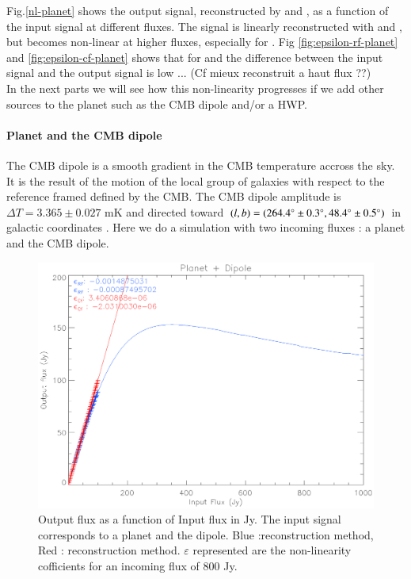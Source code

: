 Fig.\ref{nl-planet} shows the output signal, reconstructed by \rf and \cf, as a function of the input signal at different fluxes. The signal is linearly reconstructed with \rf and \cf, but becomes non-linear at higher fluxes, especially for \rf. Fig \ref{fig:epsilon-rf-planet} and \ref{fig:epsilon-cf-planet} shows that for \rf and \cf the difference between the input signal and the output signal is low ... (Cf mieux reconstruit a haut flux ??)\\

In the next parts we will see how this non-linearity progresses if we add other sources to the planet such as the CMB dipole and/or a HWP.

\paragraph{Planet and the CMB dipole \\}

The CMB dipole is a smooth gradient in the CMB temperature accross the sky. It is the result of the motion of the local group of galaxies with respect to the reference framed defined by the CMB. The CMB dipole amplitude is $\Delta T = 3.365 \pm 0.027$ mK and directed toward $(l,b) = (264.4 \degree \pm 0.3 \degree , 48.4 \degree \pm 0.5 \degree)$ in galactic coordinates \citep{2015IJMPD..2430004B}. Here we do a simulation with two incoming fluxes : a planet and the CMB dipole. 

\begin{figure}[h]
\center
	\includegraphics[scale=0.5]{Figures/nl-planet-dipole.eps}
	\caption{Output flux as a function of Input flux in Jy. The input signal corresponds to a planet and the dipole. Blue :\rf reconstruction method, Red : \cf reconstruction method. $\varepsilon$  represented are the non-linearity cofficients for an incoming flux of 800 Jy.}
	\label{fig:nl-planet-dipole}
\end{figure}

